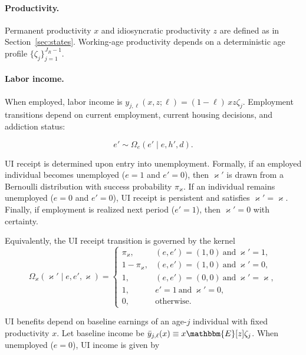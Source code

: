 \documentclass[parskip=full]{article}
\theoremstyle{plain}
\theoremstyle{definition}
\theoremstyle{remark}
\begin{document}
\paragraph{Productivity.}
Permanent productivity $x$ and idiosyncratic productivity $z$ are defined as in Section~\ref{sec:states}. Working-age productivity depends on a deterministic age profile $\{\zeta_j\}_{j=1}^{J_R-1}$.

\paragraph{Labor income.}
When employed, labor income is $y_{j,\ell}\!\left(x,z;\ell\right)= (1-\ell)\,x z \zeta_j$. Employment transitions depend on current employment, current housing decisions, and addiction status:

\begin{equation}\label{eq:e_transition}
e' \sim \Omega_e\!\left(e' \mid e, h', d\right).
\end{equation}

UI receipt is determined upon entry into unemployment. Formally, if an employed individual becomes unemployed ($e=1$ and $e'=0$), then $\varkappa'$ is drawn from a Bernoulli distribution with success probability $\pi_\varkappa$. If an individual remains unemployed ($e=0$ and $e'=0$), UI receipt is persistent and satisfies $\varkappa'=\varkappa$. Finally, if employment is realized next period ($e'=1$), then $\varkappa'=0$ with certainty.

Equivalently, the UI receipt transition is governed by the kernel
\begin{equation}\label{eq:kappa_transition}
\Omega_{\varkappa}(\varkappa' \mid e,e',\varkappa)=
\begin{cases}
\pi_{\varkappa}, & (e,e')=(1,0)\ \text{and}\ \varkappa'=1,\\
1-\pi_{\varkappa}, & (e,e')=(1,0)\ \text{and}\ \varkappa'=0,\\
1, & (e,e')=(0,0)\ \text{and}\ \varkappa'=\varkappa,\\
1, & e'=1\ \text{and}\ \varkappa'=0,\\
0, & \text{otherwise.}
\end{cases}
\end{equation}

UI benefits depend on baseline earnings of an age-$j$ individual with fixed productivity $x$. Let baseline income be $
\bar y_{j,\ell}(x)\equiv x \mathbbm{E}[z]\zeta_{j}$. When unemployed ($e=0$), UI income is given by
\end{document}
